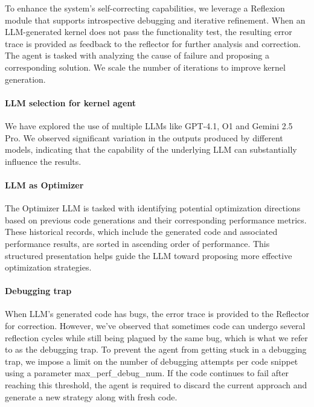 To enhance the system's self-correcting capabilities, we leverage a Reflexion\cite{shinn2023reflexionlanguageagentsverbal} module that supports introspective debugging and iterative refinement. When an LLM-generated kernel does not pass the functionality test, the resulting error trace is provided as feedback to the reflector for further analysis and correction. The agent is tasked with analyzing the cause of failure and proposing a corresponding solution. We scale the number of iterations to improve kernel generation. 

\paragraph{LLM selection for kernel agent}  

We have explored the use of multiple LLMs like GPT-4.1, O1 and Gemini 2.5 Pro. We observed significant variation in the outputs produced by different models, indicating that the capability of the underlying LLM can substantially influence the results. 

\paragraph{LLM as Optimizer} 

The Optimizer LLM is tasked with identifying potential optimization directions based on previous code generations and their corresponding performance metrics. These historical records, which include the generated code and associated performance results, are sorted in ascending order of performance. This structured presentation helps guide the LLM toward proposing more effective optimization strategies. \cite{yang2024largelanguagemodelsoptimizers}

\paragraph{Debugging trap} 

When LLM’s generated code has bugs, the error trace is provided to the Reflector for correction. However, we've observed that sometimes code can undergo several reflection cycles while still being plagued by the same bug, which is what we refer to as the debugging trap. To prevent the agent from getting stuck in a debugging trap, we impose a limit on the number of debugging attempts per code snippet using a parameter max\_perf\_debug\_num. If the code continues to fail after reaching this threshold, the agent is required to discard the current approach and generate a new strategy along with fresh code. 

